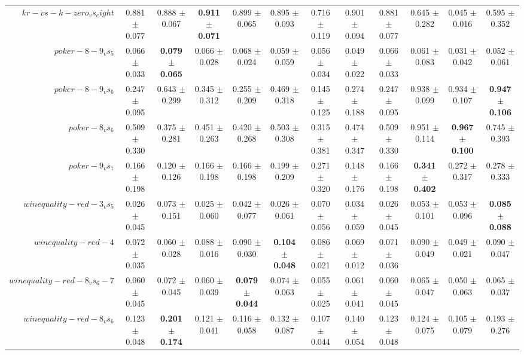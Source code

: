 \begin{table}[!ht]
{\begin{tabular}{r c c c c c c c c c c c}
$kr-vs-k-zero_vs_eight$ & 0.881 $\pm$ 0.077 & 0.888 $\pm$ 0.067 & \textbf{0.911 $\pm$ 0.071} & 0.899 $\pm$ 0.065 & 0.895 $\pm$ 0.093 & 0.716 $\pm$ 0.119 & 0.901 $\pm$ 0.094 & 0.881 $\pm$ 0.077 & 0.645 $\pm$ 0.282 & 0.045 $\pm$ 0.016 & 0.595 $\pm$ 0.352 \\
$poker-8-9_vs_5$ & 0.066 $\pm$ 0.033 & \textbf{0.079 $\pm$ 0.065} & 0.066 $\pm$ 0.028 & 0.068 $\pm$ 0.024 & 0.059 $\pm$ 0.059 & 0.056 $\pm$ 0.034 & 0.049 $\pm$ 0.022 & 0.066 $\pm$ 0.033 & 0.061 $\pm$ 0.083 & 0.031 $\pm$ 0.042 & 0.052 $\pm$ 0.061 \\
$poker-8-9_vs_6$ & 0.247 $\pm$ 0.095 & 0.643 $\pm$ 0.299 & 0.345 $\pm$ 0.312 & 0.255 $\pm$ 0.209 & 0.469 $\pm$ 0.318 & 0.145 $\pm$ 0.125 & 0.274 $\pm$ 0.188 & 0.247 $\pm$ 0.095 & 0.938 $\pm$ 0.099 & 0.934 $\pm$ 0.107 & \textbf{0.947 $\pm$ 0.106} \\
$poker-8_vs_6$ & 0.509 $\pm$ 0.330 & 0.375 $\pm$ 0.281 & 0.451 $\pm$ 0.263 & 0.420 $\pm$ 0.268 & 0.503 $\pm$ 0.308 & 0.315 $\pm$ 0.381 & 0.474 $\pm$ 0.347 & 0.509 $\pm$ 0.330 & 0.951 $\pm$ 0.114 & \textbf{0.967 $\pm$ 0.100} & 0.745 $\pm$ 0.393 \\
$poker-9_vs_7$ & 0.166 $\pm$ 0.198 & 0.120 $\pm$ 0.126 & 0.166 $\pm$ 0.198 & 0.166 $\pm$ 0.198 & 0.199 $\pm$ 0.209 & 0.271 $\pm$ 0.320 & 0.148 $\pm$ 0.176 & 0.166 $\pm$ 0.198 & \textbf{0.341 $\pm$ 0.402} & 0.272 $\pm$ 0.317 & 0.278 $\pm$ 0.333 \\
$winequality-red-3_vs_5$ & 0.026 $\pm$ 0.045 & 0.073 $\pm$ 0.151 & 0.025 $\pm$ 0.060 & 0.042 $\pm$ 0.077 & 0.026 $\pm$ 0.061 & 0.070 $\pm$ 0.056 & 0.034 $\pm$ 0.059 & 0.026 $\pm$ 0.045 & 0.053 $\pm$ 0.101 & 0.053 $\pm$ 0.096 & \textbf{0.085 $\pm$ 0.088} \\
$winequality-red-4$ & 0.072 $\pm$ 0.035 & 0.060 $\pm$ 0.028 & 0.088 $\pm$ 0.016 & 0.090 $\pm$ 0.030 & \textbf{0.104 $\pm$ 0.048} & 0.086 $\pm$ 0.021 & 0.069 $\pm$ 0.012 & 0.071 $\pm$ 0.036 & 0.090 $\pm$ 0.049 & 0.049 $\pm$ 0.021 & 0.090 $\pm$ 0.047 \\
$winequality-red-8_vs_6-7$ & 0.060 $\pm$ 0.045 & 0.072 $\pm$ 0.045 & 0.060 $\pm$ 0.039 & \textbf{0.079 $\pm$ 0.044} & 0.074 $\pm$ 0.063 & 0.055 $\pm$ 0.025 & 0.061 $\pm$ 0.041 & 0.060 $\pm$ 0.045 & 0.065 $\pm$ 0.047 & 0.050 $\pm$ 0.063 & 0.065 $\pm$ 0.037 \\
$winequality-red-8_vs_6$ & 0.123 $\pm$ 0.048 & \textbf{0.201 $\pm$ 0.174} & 0.121 $\pm$ 0.041 & 0.116 $\pm$ 0.058 & 0.132 $\pm$ 0.087 & 0.107 $\pm$ 0.044 & 0.140 $\pm$ 0.054 & 0.123 $\pm$ 0.048 & 0.124 $\pm$ 0.075 & 0.105 $\pm$ 0.079 & 0.193 $\pm$ 0.276 \\

\end{tabular}}
\end{table}
